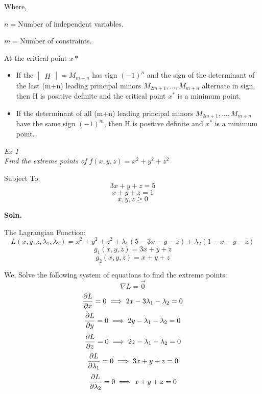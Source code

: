 \documentclass[12pt, letterpaper]{article}
\begin{document}
Where, 

$ n = $Number of independent variables.

$ m = $Number of constraints.

At the critical point $x*$
\begin{itemize}
    \item If the $\begin{vmatrix}H\end{vmatrix} = M_{m+n}$ has sign $(-1)^n$ and the sign of the determinant of the last (m+n) leading principal minors $M_{2m+1},...,M_{m+n}$ alternate in sign, then H is positive definite and the critical point $x^*$ is a minimum point.
    
    \item If the determinant of all (m+n) leading principal minors $M_{2m+1},..., M_{m+n}$ have the same sign $(-1)^m$, then H is positive definite and $x^*$ is a minimum point. 
\end{itemize}

\emph{Ex-1 \\
Find the extreme points of $f(x,y,z) = x^2 + y^2 + z^2$}

Subject To:
$$ 3x + y + z = 5 $$
$$ x + y + z = 1 $$
$$ x,y,z \geq 0 $$


\textbf{Soln.}

The Lagrangian Function:
\begin{equation}
    L(x,y,z,\lambda_1,\lambda_2) = x^2 + y^2 + z^2 + \lambda_1(5-3x-y-z) + \lambda_2(1-x-y-z)
\end{equation}
\begin{equation}
    g_1(x,y,z) = 3x + y + z
\end{equation}
\begin{equation}
    g_2(x,y,z) = x + y + z
\end{equation}

We, Solve the following system of equations to find the extreme points:
\begin{equation}
    \nabla L = \overrightarrow 0
\end{equation}
\begin{equation}
    \pdv{L}{x} = 0 \implies 2x-3\lambda_1-\lambda_2 = 0
\end{equation}
\begin{equation}
    \pdv{L}{y} = 0 \implies 2y-\lambda_1-\lambda_2 = 0
\end{equation}
\begin{equation}
    \pdv{L}{z} = 0 \implies 2z-\lambda_1-\lambda_2 = 0
\end{equation}
\begin{equation}
    \pdv{L}{\lambda_1} = 0 \implies 3x+y+z = 0
\end{equation}
\begin{equation}
    \pdv{L}{\lambda_2} = 0 \implies x+y+z = 0
\end{equation}
\end{document}
